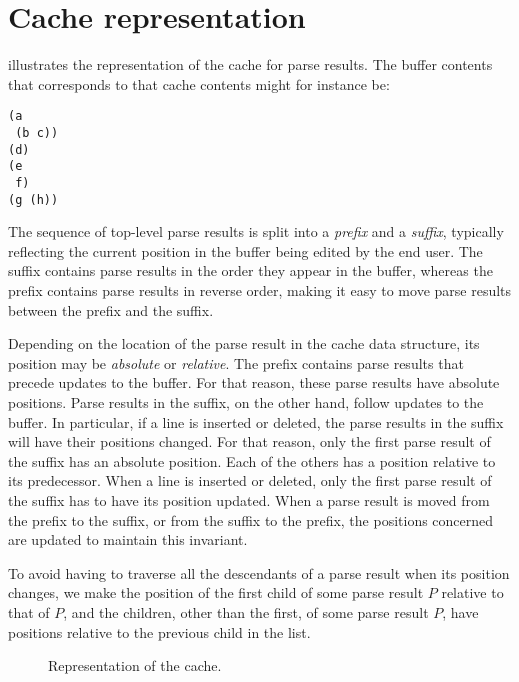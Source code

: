 \section{Cache representation}
\label{app-cache-representation}

 illustrates the representation of the cache for
parse results.  The buffer contents that corresponds to that cache
contents might for instance be:

\begin{verbatim}
(a
 (b c))
(d)
(e
 f)
(g (h))
\end{verbatim}

The sequence of top-level parse results is split into a \emph{prefix}
and a \emph{suffix}, typically reflecting the current position in the
buffer being edited by the end user.  The suffix contains parse
results in the order they appear in the buffer, whereas the prefix
contains parse results in reverse order, making it easy to move parse
results between the prefix and the suffix.

Depending on the location of the parse result in the cache data
structure, its position may be \emph{absolute} or \emph{relative}.
The prefix contains parse results that precede updates to the buffer.
For that reason, these parse results have absolute positions.  Parse
results in the suffix, on the other hand, follow updates to the
buffer.  In particular, if a line is inserted or deleted, the parse
results in the suffix will have their positions changed.  For that
reason, only the first parse result of the suffix has an absolute
position.  Each of the others has a position relative to its
predecessor.  When a line is inserted or deleted, only the first parse
result of the suffix has to have its position updated.  When a parse
result is moved from the prefix to the suffix, or from the suffix to
the prefix, the positions concerned are updated to maintain this
invariant.

To avoid having to traverse all the descendants of a parse result when
its position changes, we make the position of the first child of some
parse result $P$ relative to that of $P$, and the children, other than
the first, of some parse result $P$, have positions relative to the
previous child in the list.

\begin{figure}
\begin{center}
\end{center}
\caption{\label{fig-cache}
Representation of the cache.}
\end{figure}

